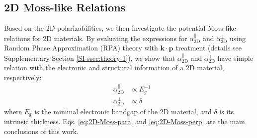 \documentclass[journal=ancac3,manuscript=article,email=true,hyperref=true,keywords=false]{achemso}
\begin{document}
\subsection{2D Moss-like  Relations}
\label{sec:first-principles}
Based on the 2D polarizabilities, we then investigate the potential
Moss-like relations for 2D materials. By evaluating the expressions
for $\alpha_{\mathrm{2D}}^{\parallel}$ and
$\alpha_{\mathrm{2D}}^{\perp}$ using Random Phase Approximation (RPA)
theory \cite{Adler_1962} with $\mathbf{k} \cdot \mathbf{p}$
treatment\cite{kittel_2005_introduction} (details see Supplementary
Section \ref{SI-ssec:theory-1}), we show that
$\alpha_{\mathrm{2D}}^{\parallel}$ and $\alpha_{\mathrm{2D}}^{\perp}$
have simple relation with the electronic  and structural information of a 2D
material, respectively:
\begin{subequations}
\begin{eqnarray}
\label{eq:2D-Moss-para}
  &\alpha_{\mathrm{2D}}^{\parallel} &\propto E_{g}^{-1} \\
  \label{eq:2D-Moss-perp}
  &\alpha_{\mathrm{2D}}^{\perp} & \propto \delta
\end{eqnarray}
\end{subequations}
where $E_{\mathrm{g}}$ is the minimal electronic bandgap of the 2D
material, and $\delta$ is its intrinsic
thickness. Eqs. \ref{eq:2D-Moss-para} and \ref{eq:2D-Moss-perp} are
the main conclusions of this work.  
\end{document}
